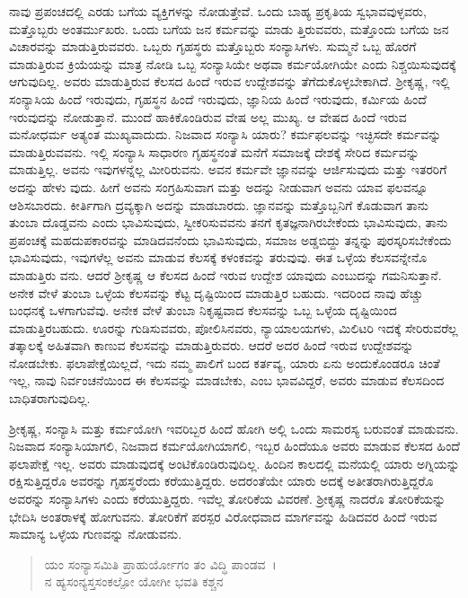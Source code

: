 ನಾವು ಪ್ರಪಂಚದಲ್ಲಿ ಎರಡು ಬಗೆಯ ವ್ಯಕ್ತಿಗಳನ್ನು ನೋಡುತ್ತೇವೆ. ಒಂದು ಬಾಹ್ಯ ಪ್ರಕೃತಿಯ ಸ್ವಭಾವವುಳ್ಳವರು, ಮತ್ತೊಬ್ಬರು ಅಂತರ್ಮುಖರು. ಒಂದು ಬಗೆಯ ಜನ ಕರ್ಮವನ್ನು ಮಾಡು ತ್ತಿರುವವರು, ಮತ್ತೊಂದು ಬಗೆಯ ಜನ ವಿಚಾರವನ್ನು ಮಾಡುತ್ತಿರುವವರು. ಒಬ್ಬರು ಗೃಹಸ್ಥರು ಮತ್ತೊಬ್ಬರು ಸಂನ್ಯಾಸಿಗಳು. ಸುಮ್ಮನೆ ಒಬ್ಬ ಹೊರಗೆ ಮಾಡುತ್ತಿರುವ ಕ್ರಿಯೆಯನ್ನು ಮಾತ್ರ ನೋಡಿ ಒಬ್ಬ ಸಂನ್ಯಾಸಿಯೇ ಅಥವಾ ಕರ್ಮಯೋಗಿಯೇ ಎಂದು ನಿಶ್ಚಯಿಸುವುದಕ್ಕೆ ಆಗುವುದಿಲ್ಲ. ಅವರು ಮಾಡುತ್ತಿರುವ ಕೆಲಸದ ಹಿಂದೆ ಇರುವ ಉದ್ದೇಶವನ್ನು ತೆಗೆದುಕೊಳ್ಳಬೇಕಾಗಿದೆ. ಶ‍್ರೀಕೃಷ್ಣ, ಇಲ್ಲಿ ಸಂನ್ಯಾಸಿಯ ಹಿಂದೆ ಇರುವುದು, ಗೃಹಸ್ಥನ ಹಿಂದೆ ಇರುವುದು, ಜ್ಞಾನಿಯ ಹಿಂದೆ ಇರುವುದು, ಕರ್ಮಿಯ ಹಿಂದೆ ಇರುವುದನ್ನು ನೋಡುತ್ತಾನೆ. ಮುಂದೆ ಹಾಕಿಕೊಂಡಿರುವ ವೇಷ ಅಲ್ಲ ಮುಖ್ಯ. ಆ ವೇಷದ ಹಿಂದೆ ಇರುವ ಮನೋಧರ್ಮ ಅತ್ಯಂತ ಮುಖ್ಯವಾದುದು. ನಿಜವಾದ ಸಂನ್ಯಾಸಿ ಯಾರು? ಕರ್ಮಫಲವನ್ನು ಇಚ್ಛಿಸದೇ ಕರ್ಮವನ್ನು ಮಾಡುತ್ತಿರುವವನು. ಇಲ್ಲಿ ಸಂನ್ಯಾಸಿ ಸಾಧಾರಣ ಗೃಹಸ್ಥನಂತೆ ಮನೆಗೆ ಸಮಾಜಕ್ಕೆ ದೇಶಕ್ಕೆ ಸೇರಿದ ಕರ್ಮವನ್ನು ಮಾಡುತ್ತಿಲ್ಲ. ಅವನು ಇವುಗಳನ್ನೆಲ್ಲ ಮೀರಿರುವನು. ಅವನ ಕರ್ಮವೇ ಜ್ಞಾನವನ್ನು ಆರ್ಜಿಸುವುದು ಮತ್ತು ಇತರರಿಗೆ ಅದನ್ನು ಹೇಳು ವುದು. ಹೀಗೆ ಅವನು ಸಂಗ್ರಹಿಸುವಾಗ ಮತ್ತು ಅದನ್ನು ನೀಡುವಾಗ ಅವನು ಯಾವ ಫಲವನ್ನೂ ಆಶಿಸಬಾರದು. ಕೀರ್ತಿಗಾಗಿ ದ್ರವ್ಯಕ್ಕಾಗಿ ಅದನ್ನು ಮಾಡಬಾರದು. ಜ್ಞಾನವನ್ನು ಮತ್ತೊಬ್ಬನಿಗೆ ಕೊಡುವಾಗ ತಾನು ತುಂಬಾ ದೊಡ್ಡವನು ಎಂದು ಭಾವಿಸುವುದು, ಸ್ವೀಕರಿಸುವವನು ತನಗೆ ಕೃತಜ್ಞನಾಗಿರಬೇಕೆಂದು ಭಾವಿಸುವುದು, ತಾನು ಪ್ರಪಂಚಕ್ಕೆ ಮಹದುಪಕಾರವನ್ನು ಮಾಡಿದವನೆಂದು ಭಾವಿಸುವುದು, ಸಮಾಜ ಅಡ್ಡಬಿದ್ದು ತನ್ನನ್ನು ಪುರಸ್ಕರಿಸಬೇಕೆಂದು ಭಾವಿಸುವುದು, ಇವುಗಳೆಲ್ಲ ಅವನು ಮಾಡುವ ಕೆಲಸಕ್ಕೆ ಕಳಂಕವನ್ನು ತರುವುವು. ಈತ ಒಳ್ಳೆಯ ಕೆಲಸವನ್ನೇನೊ ಮಾಡುತ್ತಿರು ವನು. ಆದರೆ ಶ‍್ರೀಕೃಷ್ಣ ಆ ಕೆಲಸದ ಹಿಂದೆ ಇರುವ ಉದ್ದೇಶ ಯಾವುದು ಎಂಬುದನ್ನು ಗಮನಿಸುತ್ತಾನೆ. ಅನೇಕ ವೇಳೆ ತುಂಬಾ ಒಳ್ಳೆಯ ಕೆಲಸವನ್ನು ಕೆಟ್ಟ ದೃಷ್ಟಿಯಿಂದ ಮಾಡುತ್ತಿರ ಬಹುದು. ಇದರಿಂದ ನಾವು ಹೆಚ್ಚು ಬಂಧನಕ್ಕೆ ಒಳಗಾಗುವೆವು. ಅನೇಕ ವೇಳೆ ತುಂಬಾ ನಿಕೃಷ್ಟವಾದ ಕೆಲಸವನ್ನು ಒಬ್ಬ ಒಳ್ಳೆಯ ದೃಷ್ಟಿಯಿಂದ ಮಾಡುತ್ತಿರಬಹುದು. ಊರನ್ನು ಗುಡಿಸುವವರು, ಪೋಲಿಸಿನವರು, ನ್ಯಾಯಾಲಯಗಳು, ಮಿಲಿಟರಿ ಇದಕ್ಕೆ ಸೇರಿರುವರೆಲ್ಲ ತತ್ಕಾಲಕ್ಕೆ ಅಹಿತವಾಗಿ ಕಾಣುವ ಕೆಲಸವನ್ನು ಮಾಡುತ್ತಿರುವರು. ಆದರೆ ಅದರ ಹಿಂದೆ ಇರುವ ಉದ್ದೇಶವನ್ನು ನೋಡಬೇಕು. ಫಲಾಪೇಕ್ಷೆಯಿಲ್ಲದೆ, ಇದು ನಮ್ಮ ಪಾಲಿಗೆ ಬಂದ ಕರ್ತವ್ಯ, ಯಾರು ಏನು ಅಂದುಕೊಂಡರೂ ಚಿಂತೆ ಇಲ್ಲ, ನಾವು ನಿರ್ವಂಚನೆಯಿಂದ ಈ ಕೆಲಸವನ್ನು ಮಾಡಬೇಕು, ಎಂಬ ಭಾವವಿದ್ದರೆ, ಅವರು ಮಾಡುವ ಕೆಲಸದಿಂದ ಬಾಧಿತರಾಗುವುದಿಲ್ಲ.

ಶ‍್ರೀಕೃಷ್ಣ, ಸಂನ್ಯಾಸಿ ಮತ್ತು ಕರ್ಮಯೋಗಿ ಇವರಿಬ್ಬರ ಹಿಂದೆ ಹೋಗಿ ಅಲ್ಲಿ ಒಂದು ಸಾಮರಸ್ಯ ಬರುವಂತೆ ಮಾಡುವನು. ನಿಜವಾದ ಸಂನ್ಯಾಸಿಯಾಗಲಿ, ನಿಜವಾದ ಕರ್ಮಯೋಗಿಯಾಗಲಿ, ಇಬ್ಬರ ಹಿಂದೆಯೂ ಅವರು ಮಾಡುವ ಕೆಲಸದ ಹಿಂದೆ ಫಲಾಪೇಕ್ಷೆ ಇಲ್ಲ. ಅವರು ಮಾಡುವುದಕ್ಕೆ ಅಂಟಿಕೊಂಡಿರುವುದಿಲ್ಲ. ಹಿಂದಿನ ಕಾಲದಲ್ಲಿ ಮನೆಯಲ್ಲಿ ಯಾರು ಅಗ್ನಿಯನ್ನು ರಕ್ಷಿಸುತ್ತಿದ್ದರೊ ಅವರನ್ನು ಗೃಹಸ್ಥರೆಂದು ಕರೆಯುತ್ತಿದ್ದರು. ಅದರಂತೆಯೇ ಯಾರು ಅದಕ್ಕೆ ಅತೀತರಾಗಿರುತ್ತಿದ್ದರೊ ಅವರನ್ನು ಸಂನ್ಯಾಸಿಗಳು ಎಂದು ಕರೆಯುತ್ತಿದ್ದರು. ಇವೆಲ್ಲ ತೋರಿಕೆಯ ವಿವರಣೆ. ಶ‍್ರೀಕೃಷ್ಣ ನಾದರೊ ತೋರಿಕೆಯನ್ನು ಭೇದಿಸಿ ಅಂತರಾಳಕ್ಕೆ ಹೋಗುವನು. ತೋರಿಕೆಗೆ ಪರಸ್ಪರ ವಿರೋಧವಾದ ಮಾರ್ಗವನ್ನು ಹಿಡಿದವರ ಹಿಂದೆ ಇರುವ ಸಾಮಾನ್ಯ ಒಳ್ಳೆಯ ಗುಣವನ್ನು ನೋಡುವನು.

\begin{verse}
ಯಂ ಸಂನ್ಯಾಸಮಿತಿ ಪ್ರಾಹುರ್ಯೋಗಂ ತಂ ವಿದ್ಧಿ ಪಾಂಡವ~।\\ನ ಹ್ಯಸಂನ್ಯಸ್ತಸಂಕಲ್ಪೋ ಯೋಗೀ ಭವತಿ ಕಶ್ಚನ 
\end{verse}


